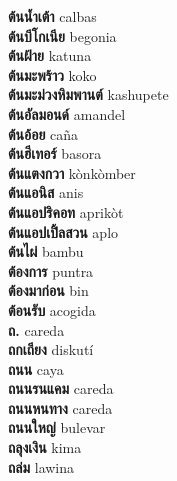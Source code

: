 \textbf{ ต้นน้ำเต้า  } calbas \\
\textbf{ ต้นบีโกเนีย  } begonia \\
\textbf{ ต้นฝ้าย  } katuna \\
\textbf{ ต้นมะพร้าว  } koko \\
\textbf{ ต้นมะม่วงหิมพานต์  } kashupete \\
\textbf{ ต้นอัลมอนด์  } amandel \\
\textbf{ ต้นอ้อย  } caña \\
\textbf{ ต้นฮีเทอร์  } basora \\
\textbf{ ต้นแตงกวา  } kònkòmber \\
\textbf{ ต้นแอนิส  } anis \\
\textbf{ ต้นแอปริคอท  } aprikòt \\
\textbf{ ต้นแอปเปิ้ลสวน  } aplo \\
\textbf{ ต้นไผ่  } bambu \\
\textbf{ ต้องการ  } puntra \\
\textbf{ ต้องมาก่อน  } bin \\
\textbf{ ต้อนรับ  } acogida \\
\textbf{ ถ.  } careda \\
\textbf{ ถกเถียง  } diskutí \\
\textbf{ ถนน  } caya \\
\textbf{ ถนนรนแคม  } careda \\
\textbf{ ถนนหนทาง  } careda \\
\textbf{ ถนนใหญ่  } bulevar \\
\textbf{ ถลุงเงิน  } kima \\
\textbf{ ถล่ม  } lawina \\
